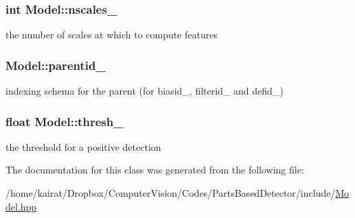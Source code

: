 \subsubsection[{nscales\+\_\+}]{\setlength{\rightskip}{0pt plus 5cm}int Model\+::nscales\+\_\+\hspace{0.3cm}{\ttfamily [protected]}}\label{classModel_ab711641b36aa9b8b578acf151af55aa7}


the number of scales at which to compute features 

\hypertarget{classModel_a4e1151fe7911f52ec75944eff1b257f4}{}
\subsubsection[{parentid\+\_\+}]{ Model\+::parentid\+\_\+\hspace{0.3cm}{\ttfamily [protected]}}\label{classModel_a4e1151fe7911f52ec75944eff1b257f4}


indexing schema for the parent (for biasid\+\_\+, filterid\+\_\+ and defid\+\_\+) 

\hypertarget{classModel_ac2263c14bbd27a5fed433494354e2b02}{}
\subsubsection[{thresh\+\_\+}]{\setlength{\rightskip}{0pt plus 5cm}float Model\+::thresh\+\_\+\hspace{0.3cm}{\ttfamily [protected]}}\label{classModel_ac2263c14bbd27a5fed433494354e2b02}


the threshold for a positive detection 



The documentation for this class was generated from the following file\+:\begin{DoxyCompactItemize}
\item 
/home/kairat/\+Dropbox/\+Computer\+Vision/\+Codes/\+Parts\+Based\+Detector/include/\hyperlink{Model_8hpp}{Model.\+hpp}\end{DoxyCompactItemize}
